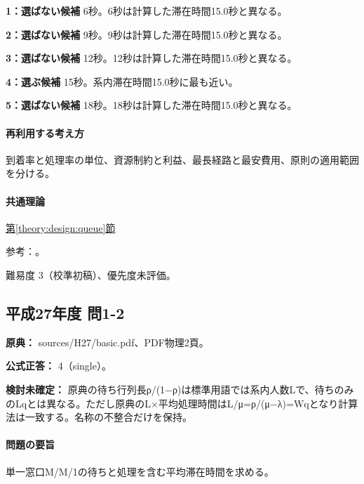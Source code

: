 \noindent\textbf{1：選ばない候補} 6秒。6秒は計算した滞在時間15.0秒と異なる。\par

\noindent\textbf{2：選ばない候補} 9秒。9秒は計算した滞在時間15.0秒と異なる。\par

\noindent\textbf{3：選ばない候補} 12秒。12秒は計算した滞在時間15.0秒と異なる。\par

\noindent\textbf{4：選ぶ候補} 15秒。系内滞在時間15.0秒に最も近い。\par

\noindent\textbf{5：選ばない候補} 18秒。18秒は計算した滞在時間15.0秒と異なる。\par

\paragraph{再利用する考え方} 到着率と処理率の単位、資源制約と利益、最長経路と最安費用、原則の適用範囲を分ける。

\paragraph{共通理論} \hyperref[theory:design:queue]{第\ref*{theory:design:queue}節}

\par 参考：\cite{design48_queue_ref}。

\par 難易度 3（校準初稿）、優先度未評価。

\subsection{平成27年度 問1-2}
\label{q:h27-reg-basic-1-2}

\noindent\textbf{原典：} sources/H27/basic.pdf、PDF物理2頁。

\textbf{公式正答：} 4（single）。

\par\textbf{検討未確定：} 原典の待ち行列長ρ/(1−ρ)は標準用語では系内人数Lで、待ちのみのLqとは異なる。ただし原典のL×平均処理時間はL/μ=ρ/(μ−λ)=\allowbreak{}Wqとなり計算法は一致する。名称の不整合だけを保持。

\paragraph{問題の要旨} 単一窓口M/M/1の待ちと処理を含む平均滞在時間を求める。

